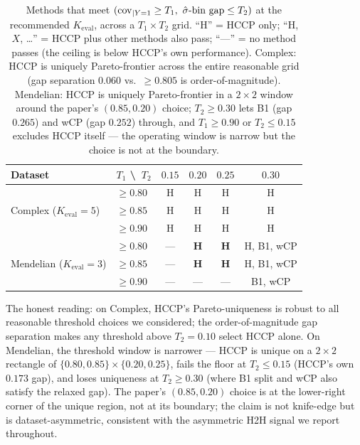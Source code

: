 \begin{table}[h]
\centering
\small
\caption{Methods that meet $(\mathrm{cov}_{|Y=1} \geq T_1,\ \hat{\sigma}\text{-bin gap} \leq T_2)$ at the recommended $K_{\mathrm{eval}}$, across a $T_1 \times T_2$ grid. ``H'' = HCCP only; ``H, $X$, \dots'' = HCCP plus other methods also pass; ``---'' = no method passes (the ceiling is below HCCP's own performance). Complex: HCCP is uniquely Pareto-frontier across the entire reasonable grid (gap separation $0.060$ vs.\ $\geq 0.805$ is order-of-magnitude). Mendelian: HCCP is uniquely Pareto-frontier in a $2 \times 2$ window around the paper's $(0.85, 0.20)$ choice; $T_2 \geq 0.30$ lets B1 (gap $0.265$) and wCP (gap $0.252$) through, and $T_1 \geq 0.90$ or $T_2 \leq 0.15$ excludes HCCP itself --- the operating window is narrow but the choice is not at the boundary.}
\label{tab:threshold_sensitivity}
\setlength{\tabcolsep}{6pt}
\begin{tabular}{llcccc}
\toprule
Dataset & $T_1$ \textbackslash\ $T_2$ & $0.15$ & $0.20$ & $0.25$ & $0.30$ \\
\midrule
\multirow{3}{*}{Complex ($K_{\mathrm{eval}} = 5$)}
 & $\geq 0.80$ & H & H & H & H \\
 & $\geq 0.85$ & H & H & H & H \\
 & $\geq 0.90$ & H & H & H & H \\
\midrule
\multirow{3}{*}{Mendelian ($K_{\mathrm{eval}} = 3$)}
 & $\geq 0.80$ & ---     & \textbf{H} & \textbf{H} & H, B1, wCP \\
 & $\geq 0.85$ & ---     & \textbf{H} & \textbf{H} & H, B1, wCP \\
 & $\geq 0.90$ & ---     & ---        & ---        & B1, wCP \\
\bottomrule
\end{tabular}
\end{table}

The honest reading: on Complex, HCCP's Pareto-uniqueness is robust to all reasonable threshold choices we considered; the order-of-magnitude gap separation makes any threshold above $T_2 = 0.10$ select HCCP alone. On Mendelian, the threshold window is narrower --- HCCP is unique on a $2 \times 2$ rectangle of $\{0.80, 0.85\} \times \{0.20, 0.25\}$, fails the floor at $T_2 \leq 0.15$ (HCCP's own $0.173$ gap), and loses uniqueness at $T_2 \geq 0.30$ (where B1 split and wCP also satisfy the relaxed gap). The paper's $(0.85, 0.20)$ choice is at the lower-right corner of the unique region, not at its boundary; the claim is not knife-edge but is dataset-asymmetric, consistent with the asymmetric H2H signal we report throughout.

